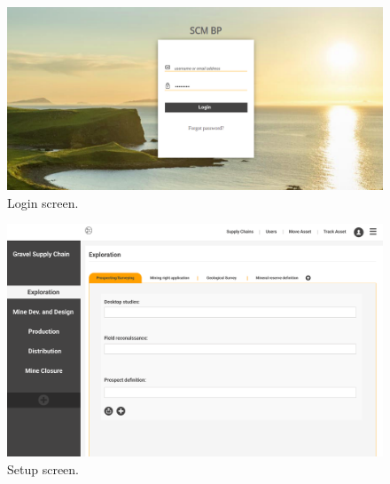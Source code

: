 \begin{figure}[H]
\begin{center}
  \includegraphics[scale=0.33]{images/login.png}
\caption{Login screen.}
\label{fig:login}
\end{center}
\end{figure}

\begin{figure}[H]
\begin{center}
  \includegraphics[scale=0.31]{images/configure_scm.png}
\caption{Setup screen.}
\label{fig:configure}
\end{center}
\end{figure}
